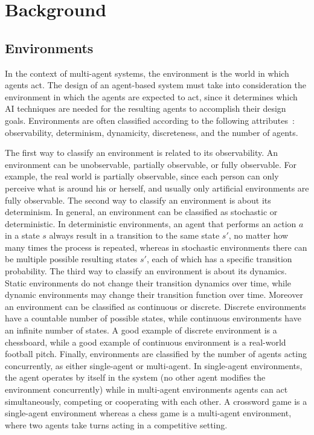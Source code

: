 \chapter{Background}
\label{chapter:background}



\section{Environments}
\label{sec:environments}

In the context of multi-agent systems, the environment is the world in which agents act.
The design of an agent-based system must take into consideration the environment in which the agents are expected to act, since it determines which AI techniques are needed for the resulting agents to accomplish their design goals. 
Environments are often classified according to the following attributes~\cite{russell1995artificial}:  observability, determinism, dynamicity, discreteness, and the number of agents. 

The first way to classify an environment is related to its observability. 
An environment can be unobservable, partially observable, or fully observable. 
For example, the real world is partially observable, since each person can only perceive what is around his or herself, and usually only artificial environments are fully observable.
% 
The second way to classify an environment is about its determinism.
In general, an environment can be classified as stochastic or deterministic.
In deterministic environments, an agent that performs an action $a$ in a state $s$ always result in a transition to the same state $s'$, no matter how many times the process is repeated, whereas in stochastic environments there can be multiple possible resulting states $s'$, each of which has a specific transition probability.
% 
The third way to classify an environment is about its dynamics. 
Static environments do not change their transition dynamics over time, while dynamic environments may change their transition function over time. 
% 
Moreover an environment can be classified as continuous or discrete.
Discrete environments have a countable number of possible states, while continuous environments have an infinite number of states.
A good example of discrete environment is a chessboard, while a good example of continuous environment is a real-world football pitch. 
% 
Finally, environments are classified by the number of agents acting concurrently, as either single-agent or multi-agent. 
In single-agent environments, the agent operates by itself in the system (no other agent modifies the environment concurrently) while in multi-agent environments agents can act simultaneously, competing or cooperating with each other. 
A crossword game is a single-agent environment whereas a chess game is a multi-agent environment, where  two agents take turns acting in a competitive setting.



